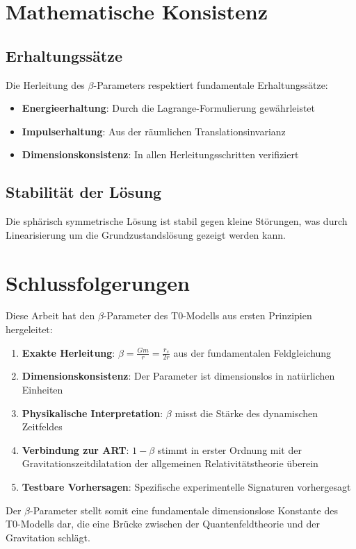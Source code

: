 	\section{Mathematische Konsistenz}
	\label{sec:mathematical_consistency}
	
	\subsection{Erhaltungssätze}
	\label{subsec:conservation_laws}
	
	Die Herleitung des $\beta$-Parameters respektiert fundamentale Erhaltungssätze:
	\begin{itemize}
		\item \textbf{Energieerhaltung}: Durch die Lagrange-Formulierung gewährleistet
		\item \textbf{Impulserhaltung}: Aus der räumlichen Translationsinvarianz
		\item \textbf{Dimensionskonsistenz}: In allen Herleitungsschritten verifiziert
	\end{itemize}
	
	\subsection{Stabilität der Lösung}
	\label{subsec:solution_stability}
	
	Die sphärisch symmetrische Lösung ist stabil gegen kleine Störungen, was durch Linearisierung um die Grundzustandslösung gezeigt werden kann.
	
	\section{Schlussfolgerungen}
	\label{sec:conclusions}
	
	Diese Arbeit hat den $\beta$-Parameter des T0-Modells aus ersten Prinzipien hergeleitet:
	
	\begin{tcolorbox}[colback=green!5!white,colframe=green!75!black,title=Hauptergebnisse]
		\begin{enumerate}
			\item \textbf{Exakte Herleitung}: $\beta = \frac{Gm}{r} = \frac{r_s}{2r}$ aus der fundamentalen Feldgleichung
			\item \textbf{Dimensionskonsistenz}: Der Parameter ist dimensionslos in natürlichen Einheiten
			\item \textbf{Physikalische Interpretation}: $\beta$ misst die Stärke des dynamischen Zeitfeldes
			\item \textbf{Verbindung zur ART}: $1 - \beta$ stimmt in erster Ordnung mit der Gravitationszeitdilatation der allgemeinen Relativitätstheorie überein
			\item \textbf{Testbare Vorhersagen}: Spezifische experimentelle Signaturen vorhergesagt
		\end{enumerate}
	\end{tcolorbox}
	
	Der $\beta$-Parameter stellt somit eine fundamentale dimensionslose Konstante des T0-Modells dar, die eine Brücke zwischen der Quantenfeldtheorie und der Gravitation schlägt.
	